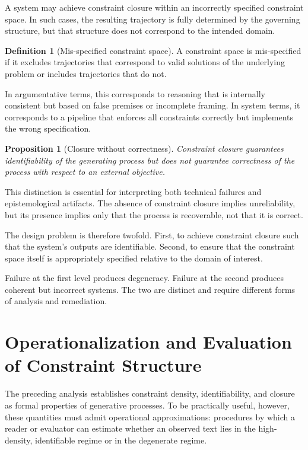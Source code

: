 \documentclass[12pt, oneside]{article}
\theoremstyle{plain}
\newtheorem{proposition}[theorem]{Proposition}
\theoremstyle{definition}
\newtheorem{definition}[theorem]{Definition}
\theoremstyle{remark}
\begin{document}
A system may achieve constraint closure within an incorrectly specified constraint
space. In such cases, the resulting trajectory is fully determined by the governing
structure, but that structure does not correspond to the intended domain.

\begin{definition}[Mis-specified constraint space]
A constraint space is mis-specified if it excludes trajectories that correspond
to valid solutions of the underlying problem or includes trajectories that do not.
\end{definition}

In argumentative terms, this corresponds to reasoning that is internally consistent
but based on false premises or incomplete framing. In system terms, it corresponds
to a pipeline that enforces all constraints correctly but implements the wrong
specification.

\begin{proposition}[Closure without correctness]
Constraint closure guarantees identifiability of the generating process but does
not guarantee correctness of the process with respect to an external objective.
\end{proposition}

This distinction is essential for interpreting both technical failures and
epistemological artifacts. The absence of constraint closure implies unreliability,
but its presence implies only that the process is recoverable, not that it is
correct.

The design problem is therefore twofold. First, to achieve constraint closure such
that the system's outputs are identifiable. Second, to ensure that the constraint
space itself is appropriately specified relative to the domain of interest.

Failure at the first level produces degeneracy. Failure at the second produces
coherent but incorrect systems. The two are distinct and require different forms
of analysis and remediation.

\section{Operationalization and Evaluation of Constraint Structure}

The preceding analysis establishes constraint density, identifiability, and closure
as formal properties of generative processes. To be practically useful, however,
these quantities must admit operational approximations: procedures by which a reader
or evaluator can estimate whether an observed text lies in the high-density,
identifiable regime or in the degenerate regime.
\end{document}
